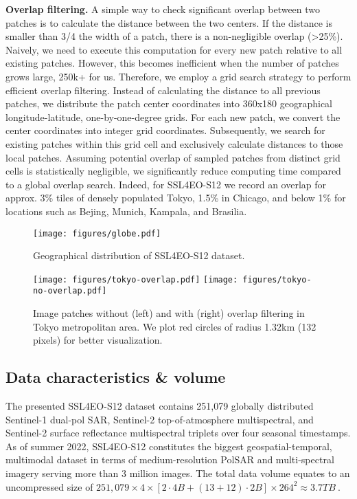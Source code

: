 \documentclass[lettersize,journal]{IEEEtran}
\begin{document}
\textbf{Overlap filtering.} A simple way to check significant overlap between two patches is to calculate the distance between the two centers. If the distance is smaller than 3/4 the width of a patch, there is a non-negligible overlap (>25\%). Naively, we need to execute this computation for every new patch relative to all existing patches. However, this becomes inefficient when the number of patches grows large, 250k+ for us. 
Therefore, we employ a grid search strategy to perform efficient overlap filtering. Instead of calculating
the distance to all previous patches, we distribute the patch center coordinates into 360x180 geographical longitude-latitude, one-by-one-degree grids. For each new patch, we convert the center coordinates into integer grid coordinates. Subsequently, we search for existing patches within this grid cell
and exclusively calculate distances to those local patches. Assuming potential overlap of sampled patches
from distinct grid cells is statistically negligible, we significantly reduce computing time compared
to a global overlap search. Indeed, for SSL4EO-S12 we record an overlap for approx. 3\% tiles of densely populated Tokyo, 1.5\% in Chicago, and below 1\% for locations such as Bejing, Munich, Kampala, and Brasilia.


\begin{figure}
  \centering
  \texttt{[image: figures/globe.pdf]}
  \caption{Geographical distribution of SSL4EO-S12 dataset.}
  \label{fig:globe}
\end{figure}

\begin{figure}[t!]
  \centering
  \texttt{[image: figures/tokyo-overlap.pdf]}
  \texttt{[image: figures/tokyo-no-overlap.pdf]}  
  \caption{Image patches without (left) and with (right) overlap filtering in Tokyo metropolitan area.
  We plot red circles of radius 1.32km (132 pixels) for better visualization.}
  \label{fig:overlap}
  \vspace{-1em}
\end{figure}

\vspace{-1em}
\subsection{Data characteristics \& volume}

The presented SSL4EO-S12 dataset contains 251,079 globally distributed Sentinel-1 dual-pol SAR, Sentinel-2 top-of-atmosphere multispectral, and Sentinel-2 surface reflectance multispectral triplets over four seasonal timestamps. As of summer 2022, SSL4EO-S12 constitutes the biggest geospatial-temporal, multimodal dataset in terms of medium-resolution PolSAR and multi-spectral imagery serving more than 3 million images. The total data volume equates to an uncompressed size of 
$251,079\times4\times\left[2\cdot4B+(13+12)\cdot2B\right]\times264^2\approx3.7TB~.$
\end{document}
